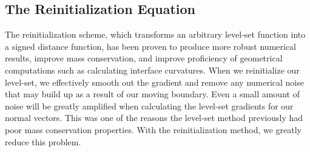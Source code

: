 \documentclass[oneside,12pt,final]{/Applications/TeX/packages/ucthesis-CA2012}
\begin{document}
\begin{mainmatter}
\section{The Reinitialization Equation} \label{section:Reinitialization_Equation}

The reinitialization scheme, which transforms an arbitrary level-set function into a signed distance function, has been proven to produce more robust numerical results, improve mass conservation, and improve proficiency of geometrical computations such as calculating interface curvatures. When we reinitialize our level-set, we effectively smooth out the gradient and remove any numerical noise that may build up as a result of our moving boundary. Even a small amount of noise will be greatly amplified when calculating the level-set gradients for our normal vectors. This was one of the reasons the level-set method previously had poor mass conservation properties. With the reinitialization method, we greatly reduce this problem.


\end{mainmatter}
\end{document}
